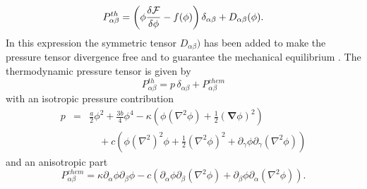 \documentclass[8.5pt,twoside,twocolumn]{article}
\begin{document}
\begin{equation}
P_{\alpha\beta}^{th}=\left(\phi\frac{\delta {\cal F}}{\delta \phi} -f(\phi)\right) \delta_{\alpha\beta} + D_{\alpha \beta}(\phi).
\end{equation}  
In this expression the symmetric tensor $D_{\alpha\beta})$ has been added to make the pressure tensor divergence free and to guarantee the mechanical equilibrium \cite{Evans79}.
The thermodynamic pressure tensor is given by
\begin{equation}
P^{th}_{\alpha \beta}=p\, \delta_{\alpha \beta} + P^{chem}_{\alpha \beta}
\end{equation}
with an isotropic pressure contribution
\begin{eqnarray}
p&=& \frac{a}{2}\phi^2+\frac{3b}{4}\phi^4-\kappa\left(\phi(\nabla^2\phi)+\frac{1}{2}({\bm \nabla}\phi)^2\right)\nonumber\\
& &\quad+c\left(\phi(\nabla^2)^2\phi+\frac{1}{2}(\nabla^2\phi)^2+\partial_{\gamma}\phi\partial_\gamma(\nabla^2\phi)\right)
\end{eqnarray}
and an anisotropic part
\begin{equation}
P^{chem}_{\alpha \beta}=\kappa\partial_\alpha\phi\partial_\beta\phi -c \left(\partial_\alpha\phi\partial_\beta(\nabla^2\phi)+\partial_\beta\phi\partial_\alpha(\nabla^2\phi)\right).
\end{equation}
\end{document}
